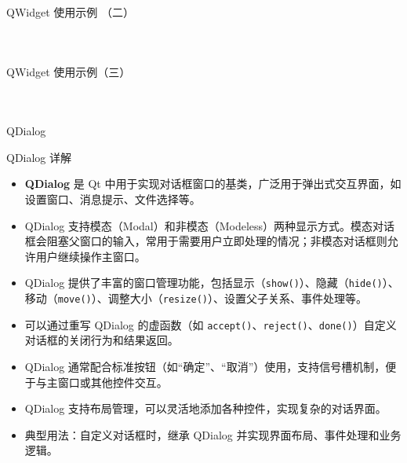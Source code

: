 \documentclass[UTF8,aspectratio=169]{beamer}
\begin{document}
\begin{frame}[fragile]{QWidget 使用示例 （二）  }
    \begin{columns}
        \begin{column}{0.48\textwidth}
            \inputminted[firstline=33,lastline=51]{cpp}{code/qt_widget_example.cpp}
        \end{column}
        \begin{column}{0.48\textwidth}
            \inputminted[firstline=52,lastline=68]{cpp}{code/qt_widget_example.cpp}
        \end{column}
    \end{columns}
\end{frame}

\begin{frame}[fragile]{QWidget 使用示例（三）  }
    \begin{columns}
        \begin{column}{0.48\textwidth}
            \inputminted[firstline=69,lastline=83]{cpp}{code/qt_widget_example.cpp}
        \end{column}
        \begin{column}{0.48\textwidth}
            \inputminted[firstline=84,lastline=98]{cpp}{code/qt_widget_example.cpp}
        \end{column}
    \end{columns}
\end{frame}

\begin{frame}{QDialog}
    \begin{ytublock}{QDialog 详解}
        \begin{itemize}
            \item \textbf{QDialog} 是 Qt 中用于实现对话框窗口的基类，广泛用于弹出式交互界面，如设置窗口、消息提示、文件选择等。
            \item QDialog 支持模态（Modal）和非模态（Modeless）两种显示方式。模态对话框会阻塞父窗口的输入，常用于需要用户立即处理的情况；非模态对话框则允许用户继续操作主窗口。
            \item QDialog 提供了丰富的窗口管理功能，包括显示（\texttt{show()}）、隐藏（\texttt{hide()}）、移动（\texttt{move()}）、调整大小（\texttt{resize()}）、设置父子关系、事件处理等。
            \item 可以通过重写 QDialog 的虚函数（如 \texttt{accept()}、\texttt{reject()}、\texttt{done()}）自定义对话框的关闭行为和结果返回。
            \item QDialog 通常配合标准按钮（如“确定”、“取消”）使用，支持信号槽机制，便于与主窗口或其他控件交互。
            \item QDialog 支持布局管理，可以灵活地添加各种控件，实现复杂的对话界面。
            \item 典型用法：自定义对话框时，继承 QDialog 并实现界面布局、事件处理和业务逻辑。
        \end{itemize}
    \end{ytublock}
\end{frame}
\end{document}
